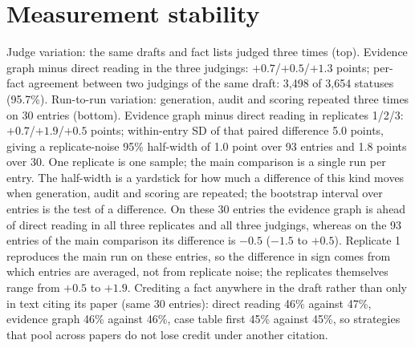 \documentclass{article} %
\begin{document}
\section{Measurement stability}
\label{app:stability}
Judge variation: the same drafts and fact lists judged three times (top). Evidence graph minus direct reading in the three judgings: $+0.7$/$+0.5$/$+1.3$ points; per-fact agreement between two judgings of the same draft: 3,498 of 3,654 statuses (95.7\%). Run-to-run variation: generation, audit and scoring repeated three times on 30 entries (bottom). Evidence graph minus direct reading in replicates 1/2/3: $+0.7$/$+1.9$/$+0.5$ points; within-entry SD of that paired difference 5.0 points, giving a replicate-noise 95\% half-width of 1.0 point over 93 entries and 1.8 points over 30. One replicate is one sample; the main comparison is a single run per entry. The half-width is a yardstick for how much a difference of this kind moves when generation, audit and scoring are repeated; the bootstrap interval over entries is the test of a difference. On these 30 entries the evidence graph is ahead of direct reading in all three replicates and all three judgings, whereas on the 93 entries of the main comparison its difference is $-0.5$ ($-1.5$ to $+0.5$). Replicate 1 reproduces the main run on these entries, so the difference in sign comes from which entries are averaged, not from replicate noise; the replicates themselves range from $+0.5$ to $+1.9$. Crediting a fact anywhere in the draft rather than only in text citing its paper (same 30 entries): direct reading 46\% against 47\%, evidence graph 46\% against 46\%, case table first 45\% against 45\%, so strategies that pool across papers do not lose credit under another citation.
\end{document}
